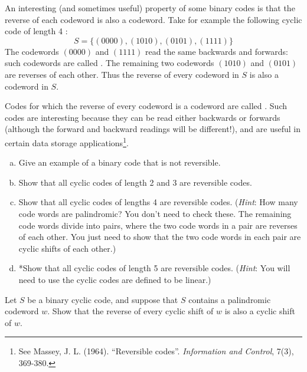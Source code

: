\begin{example}\label{example:polycodes:cyclic_poly}
An interesting (and sometimes useful) property of some binary codes is that the reverse of each codeword is also a codeword. 
Take for example the following cyclic  code of length 4 :
 \[S = \{(0000),(1010),(0101),(1111)\}\]  
The codewords $(0000)$ and $(1111)$ read the same backwards and forwards: such codewords are called . The remaining two codewords $(1010)$ and $(0101)$ are reverses of each other. Thus the reverse of every codeword in $S$ is also a codeword in $S$.

Codes for which the reverse of every codeword is a codeword are called .  Such codes are interesting because they can be read either backwards or forwards (although the forward and backward readings will be different!), and are useful in certain data storage applications\footnote{See Massey, J. L. (1964). ``Reversible codes''. \textit{Information and Control}, 7(3), 369-380.}.  
\end{example}

\begin{exercise}
\begin{enumerate}[(a)]
\item
Give an example of a binary code that is not reversible.
\item
Show that all cyclic codes of length 2 and 3 are reversible codes.
\item
Show that all cyclic codes of lengths 4 are  reversible codes. (\emph{Hint}: How many code words are palindromic? You don't need to check these.  The remaining code words divide into pairs, where the two code words in a pair are reverses of each other. You just need to show that the two code words in each pair are cyclic shifts of each other.) 
\item
*Show that all cyclic codes of length 5 are  reversible codes. (\emph{Hint}:  You will need to use the cyclic codes are defined to be linear.)
\end{enumerate}
\end{exercise}

\begin{exercise}
Let $S$ be a binary cyclic code, and suppose that $S$ contains a palindromic codeword $w$. Show that the reverse of every cyclic shift of $w$ is also a cyclic shift of $w$.
\end{exercise}

